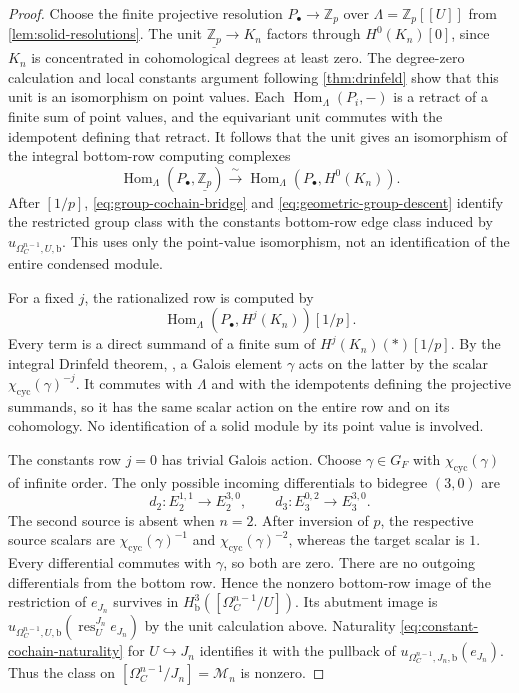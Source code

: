 \documentclass[11pt]{article}
\numberwithin{equation}{section}
\theoremstyle{definition}
\theoremstyle{remark}
\begin{document}
\begin{proof}
Choose the finite projective resolution
$P_\bullet\to\mathbb Z_p$ over $\Lambda=\mathbb Z_p[[U]]$ from
\cref{lem:solid-resolutions}.  The unit
$\underline{\mathbb Z_p}\to K_n$ factors through $H^0(K_n)[0]$, since
$K_n$ is concentrated in cohomological degrees at least zero.
The degree-zero calculation and local constants argument following
\cref{thm:drinfeld} show that this unit is an isomorphism on point
values.  Each $\operatorname{Hom}_\Lambda(P_i,-)$ is a retract of a finite sum of
point values, and the equivariant unit commutes with the idempotent
defining that retract.  It follows that the unit gives an isomorphism
of the integral bottom-row computing complexes
\[
 \operatorname{Hom}_\Lambda(P_\bullet,\underline{\mathbb Z_p})
       \xrightarrow{\ \sim\ }
 \operatorname{Hom}_\Lambda(P_\bullet,H^0(K_n)).
\]
After $[1/p]$, \eqref{eq:group-cochain-bridge} and
\eqref{eq:geometric-group-descent} identify the restricted group
class with the constants bottom-row edge class induced by
$u_{\Omega_C^{n-1},U,\mathrm b}$.  This uses only the point-value
isomorphism, not an identification of the entire condensed module.

For a fixed $j$, the rationalized row is
computed by
\[
 \operatorname{Hom}_\Lambda(P_\bullet,H^j(K_n))[1/p].
\]
Every term is a direct summand of a finite sum of
$H^j(K_n)(*)[1/p]$.  By the integral Drinfeld theorem,
\cite[Theorem 1.1]{CDN2021}, a Galois element $\gamma$ acts on the latter
by the scalar $\chi_{\mathrm{cyc}}(\gamma)^{-j}$.
It commutes with $\Lambda$ and with the idempotents defining the
projective summands, so it has the same scalar action on the entire
row and on its cohomology.  No identification of a solid module by
its point value is involved.

The constants row $j=0$ has trivial Galois action.
Choose $\gamma\in G_F$ with $\chi_{\mathrm{cyc}}(\gamma)$ of infinite
order.  The only possible incoming differentials to bidegree $(3,0)$
are
\[
 d_2:E_2^{1,1}\longrightarrow E_2^{3,0},
 \qquad
 d_3:E_3^{0,2}\longrightarrow E_3^{3,0}.
\]
The second source is absent when $n=2$.
After inversion of $p$, the respective source scalars are
$\chi_{\mathrm{cyc}}(\gamma)^{-1}$ and
$\chi_{\mathrm{cyc}}(\gamma)^{-2}$, whereas the target scalar is $1$.
Every differential commutes with $\gamma$, so both are zero.
There are no outgoing differentials from the bottom row.
Hence the nonzero bottom-row image of the restriction of $e_{J_n}$
survives in $H^3_{\mathrm b}([\Omega_C^{n-1}/U])$.
Its abutment image is
$u_{\Omega_C^{n-1},U,\mathrm b}(\operatorname{res}^{J_n}_U e_{J_n})$
by the unit calculation
above.  Naturality \eqref{eq:constant-cochain-naturality} for
$U\hookrightarrow J_n$ identifies it with the pullback of
$u_{\Omega_C^{n-1},J_n,\mathrm b}(e_{J_n})$.
Thus the class on $[\Omega_C^{n-1}/J_n]=\mathcal M_n$ is nonzero.


\end{proof}
\end{document}
